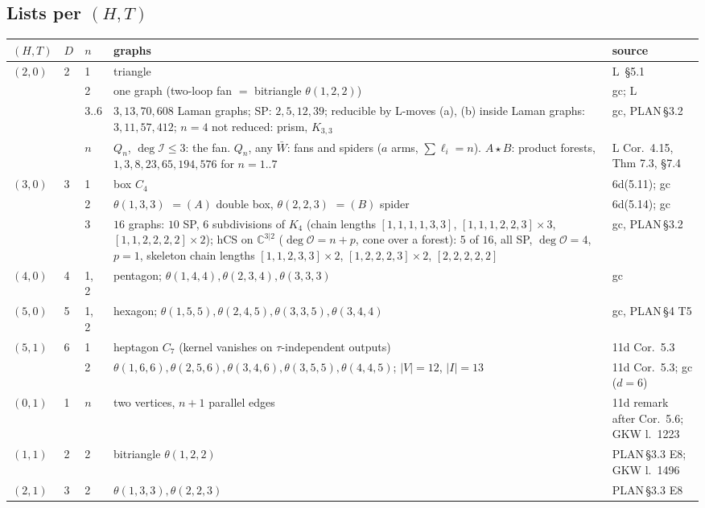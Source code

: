 \documentclass[10pt,a4paper]{article}
\numberwithin{equation}{section}
\newcommand{\cI}{\mathcal I}
\newcommand{\cO}{\mathcal O}
\newcommand{\Sd}[1]{\textsf{6d}(#1)}
\newcommand{\PL}[1]{\textsf{PLAN}\,\S#1}
\begin{document}
\subsection{Lists per $(H,T)$}

{\small
\begin{longtable}{@{}p{1.2cm}p{0.5cm}p{0.6cm}p{9.0cm}p{3.8cm}@{}}
\toprule
$(H,T)$ & $D$ & $n$ & graphs & source\\
\midrule\endhead
$(2,0)$ & 2 & 1 & triangle & \textsf{L}~\S5.1\\
 & & 2 & one graph (two-loop fan $=$ bitriangle $\theta(1,2,2)$) & \textsf{gc}; \textsf{L}\\
 & & $3..6$ & $3,13,70,608$ Laman graphs; SP: $2,5,12,39$; reducible by \textsf{L}-moves (a), (b) inside Laman graphs: $3,11,57,412$; $n=4$ not reduced: prism, $K_{3,3}$ & \textsf{gc}, \PL{3.2}\\
 & & $n$ & $Q_n$, $\deg\cI\le3$: the fan. $Q_n$, any $\bar W$: fans and spiders ($a$ arms, $\sum\ell_i=n$). $A\star B$: product forests, $1,3,8,23,65,194,576$ for $n=1..7$ & \textsf{L} Cor.~4.15, Thm 7.3, \S7.4\\
$(3,0)$ & 3 & 1 & box $C_4$ & \Sd{5.11}; \textsf{gc}\\
 & & 2 & $\theta(1,3,3)$ $=(A)$ double box, $\theta(2,2,3)$ $=(B)$ spider & \Sd{5.14}; \textsf{gc}\\
 & & 3 & $16$ graphs: $10$ SP, $6$ subdivisions of $K_4$ (chain lengths $[1,1,1,1,3,3]$, $[1,1,1,2,2,3]\times3$, $[1,1,2,2,2,2]\times2$); hCS on $\mathbb C^{3|2}$ ($\deg\cO=n+p$, cone over a forest): $5$ of $16$, all SP, $\deg\cO=4$, $p=1$, skeleton chain lengths $[1,1,2,3,3]\times2$, $[1,2,2,2,3]\times2$, $[2,2,2,2,2]$ & \textsf{gc}, \PL{3.2}\\
$(4,0)$ & 4 & 1, 2 & pentagon; $\theta(1,4,4),\theta(2,3,4),\theta(3,3,3)$ & \textsf{gc}\\
$(5,0)$ & 5 & 1, 2 & hexagon; $\theta(1,5,5),\theta(2,4,5),\theta(3,3,5),\theta(3,4,4)$ & \textsf{gc}, \PL{4} T5\\
$(5,1)$ & 6 & 1 & heptagon $C_7$ (kernel vanishes on $\tau$-independent outputs) & \textsf{11d} Cor.~5.3\\
 & & 2 & $\theta(1,6,6),\theta(2,5,6),\theta(3,4,6),\theta(3,5,5),\theta(4,4,5)$; $|V|=12$, $|I|=13$ & \textsf{11d} Cor.~5.3; \textsf{gc} ($d=6$)\\
$(0,1)$ & 1 & $n$ & two vertices, $n+1$ parallel edges & \textsf{11d} remark after Cor.~5.6; \textsf{GKW} l.~1223\\
$(1,1)$ & 2 & 2 & bitriangle $\theta(1,2,2)$ & \PL{3.3} E8; \textsf{GKW} l.~1496\\
$(2,1)$ & 3 & 2 & $\theta(1,3,3),\theta(2,2,3)$ & \PL{3.3} E8\\
\bottomrule
\end{longtable}}
\end{document}
